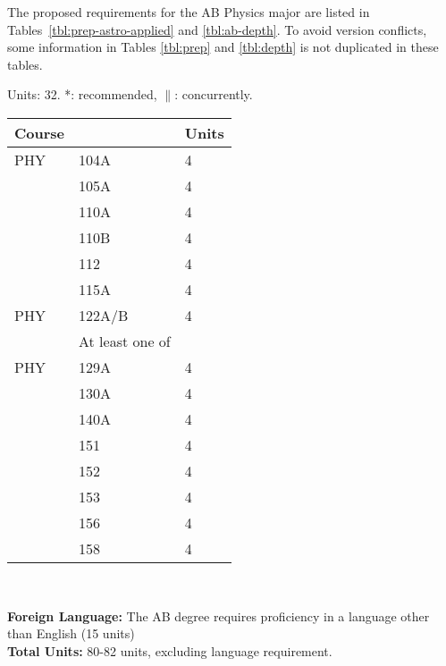 \documentclass[12pt]{article}
\begin{document}
The proposed requirements for the AB Physics major are listed in
Tables~\ref{tbl:prep-astro-applied} and \ref{tbl:ab-depth}.  To avoid
version conflicts, some information in Tables \ref{tbl:prep} and
\ref{tbl:depth} is not duplicated in these tables.

\noindent
\vskip 0.25cm
\begin{center}
Units:  32. *: recommended, $\parallel$: concurrently.\\
\begin{tabular}{|lll|}
\hline
Course & & Units \\
\hline
PHY & 104A & 4 \\
    & 105A & 4 \\
    & 110A & 4 \\
    & 110B & 4 \\
    & 112  & 4 \\
    & 115A & 4 \\
\hline
\hline
PHY & 122A/B & 4 \\
\hline
    & At least one of & \\ 
\hline
PHY & 129A & 4 \\
    & 130A & 4 \\
    & 140A & 4 \\
    & 151 & 4 \\
    & 152 & 4 \\
    & 153 & 4 \\
    & 156 & 4 \\
    & 158 & 4 \\
\hline
\end{tabular}\\ \vskip 0.25cm
\end{center}
\noindent
{\bf Foreign Language:} The AB degree requires proficiency in a language other than English (15 units)\\
\noindent
{\bf Total Units:} 80-82 units, excluding language requirement.
\end{document}
